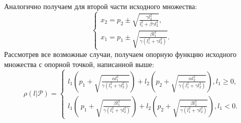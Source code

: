\documentclass[11pt]{article}
\begin{document}
	{Аналогично получаем для второй части исходного множества:}
	\[ \begin{cases}
	x_2 = p_2 \pm \sqrt{\frac{\gamma l_2^{2}}{l_1^{2} + \beta\gamma l_2^{2}}},\\
	x_1 = p_1 \pm \sqrt{\frac{\beta l_1^{2}}{\gamma(l_1^{2} + \gamma l_2^{2})}}.
	\end{cases} \]
	{Рассмотрев все возможные случаи, получаем опорную функцию исходного множества с опорной точкой, написанной выше:}
	\[ \rho(l|\mathcal{P}) = \begin{cases}
	l_1\left( p_1 + \sqrt{\frac{\alpha l_1^{2}}{\gamma(l_1^{2} + \gamma l_2^{2})}}\right) + l_2\left( p_2 + \sqrt{\frac{\alpha l_2^{2}}{\gamma(l_1^{2} + \gamma l_2^{2})}}\right) , l_1 \geq 0,\\
	l_1\left(\ p_1 + \sqrt{\frac{\beta l_1^{2}}{\gamma(l_1^{2} + \gamma l_2^{2})}}\right) + l_2\left( p_2 + \sqrt{\frac{\beta l_2^{2}}{\gamma(l_1^{2} + \gamma l_2^{2})}}\right), l_1 < 0.
	\end{cases} \]
	
	\newpage
	
\end{document}
